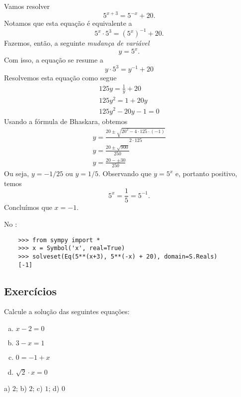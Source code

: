 \begin{ex}
  Vamos resolver
  \begin{equation}
    5^{x+3} = 5^{-x} + 20.
  \end{equation}
  Notamos que esta equação é equivalente a
  \begin{equation}
    5^x\cdot 5^3 = \left(5^x\right)^{-1} + 20.
  \end{equation}
  Fazemos, então, a seguinte \emph{mudança de variável}
  \begin{equation}
    y = 5^x.
  \end{equation}
  Com isso, a equação se resume a
  \begin{equation}
    y\cdot 5^3 = y^{-1} + 20
  \end{equation}
  Resolvemos esta equação como segue
  \begin{gather}
    125y = \frac{1}{y} + 20 \\
    125y^2 = 1 + 20y \\
    125y^2 - 20y - 1 = 0
  \end{gather}
  Usando a fórmula de Bhaskara, obtemos
  \begin{gather}
    y = \frac{20 \pm \sqrt{20^2 - 4\cdot 125\cdot (-1)}}{2\cdot 125}\\
    y = \frac{20 \pm \sqrt{900}}{250} \\
    y = \frac{20 - \pm 30}{250}
  \end{gather}
  Ou seja, $y = -1/25$ ou $y = 1/5$. Observando que $y=5^x$ e, portanto positivo, temos
  \begin{equation}
    5^x = \frac{1}{5} = 5^{-1}.
  \end{equation}
  Concluímos que $x = -1$.

  \ifispython
  No \python:
  \begin{lstlisting}
    >>> from sympy import *
    >>> x = Symbol('x', real=True)
    >>> solveset(Eq(5**(x+3), 5**(-x) + 20), domain=S.Reals)
    [-1]
  \end{lstlisting}
  \fi  
\end{ex}

\subsection*{Exercícios}

\begin{exer}
  Calcule a solução das seguintes equações:
  \begin{enumerate}[a)]
  \item $x - 2 = 0$
  \item $3 - x = 1$
  \item $0 = -1 + x$
  \item $\sqrt{2}\cdot x = 0$
  \end{enumerate}
\end{exer}
\begin{resp}
  a) $2$; b) $2$; c) $1$; d) $0$
\end{resp}

